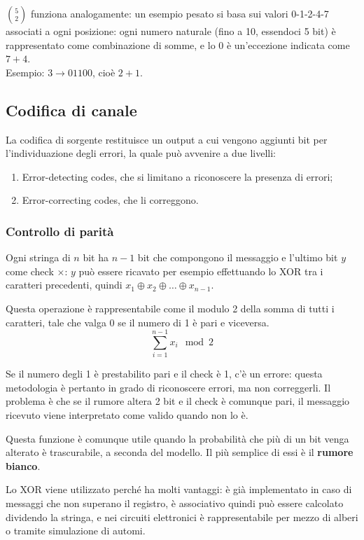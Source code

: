 $\binom{5}{2}$ funziona analogamente: un esempio pesato si basa sui valori 0-1-2-4-7 associati a ogni posizione: ogni numero naturale (fino a 10, essendoci 5 bit) è rappresentato come combinazione di somme, e lo 0 è un'eccezione indicata come $7+4$. \\
Esempio: $3 \rightarrow 01100$, cioè $2+1$.

\subsection{Codifica di canale}
La codifica di sorgente restituisce un output a cui vengono aggiunti bit per l'individuazione degli errori, la quale può avvenire a due livelli:
\begin{enumerate}
	\item Error-detecting codes, che si limitano a riconoscere la presenza di errori;
	\item Error-correcting codes, che li correggono.
\end{enumerate}

\subsubsection{Controllo di parità}
Ogni stringa di $n$ bit ha $n - 1$ bit che compongono il messaggio e l'ultimo bit $y$ come check $\times$: $y$ può essere ricavato per esempio effettuando lo XOR tra i caratteri precedenti, quindi $x_1 \oplus x_2 \oplus \dots \oplus x_{n-1}$. 

Questa operazione è rappresentabile come il modulo 2 della somma di tutti i caratteri, tale che valga 0 se il numero di 1 è pari e viceversa. \\
$$\sum_{i=1}^{n-1} x_i \mod 2$$

Se il numero degli 1 è prestabilito pari e il check è 1, c'è un errore: questa metodologia è pertanto in grado di riconoscere errori, ma non correggerli. Il problema è che se il rumore altera 2 bit e il check è comunque pari, il messaggio ricevuto viene interpretato come valido quando non lo è.

Questa funzione è comunque utile quando la probabilità che più di un bit venga alterato è trascurabile, a seconda del modello. Il più semplice di essi è il \textbf{rumore bianco}.

Lo XOR viene utilizzato perché ha molti vantaggi: è già implementato in caso di messaggi che non superano il registro, è associativo quindi può essere calcolato dividendo la stringa, e nei circuiti elettronici è rappresentabile per mezzo di alberi o tramite simulazione di automi.


